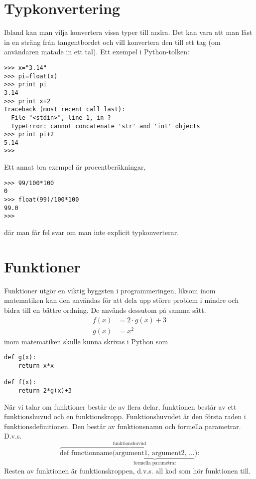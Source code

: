 \section{Typkonvertering}

Ibland kan man vilja konvertera vissa typer till andra. Det kan vara att man
läst in en sträng från tangentbordet och vill konvertera den till ett tag
(om användaren matade in ett tal). Ett exempel i Python-tolken:
\begin{lstlisting}[style=text]
>>> x="3.14"
>>> pi=float(x)
>>> print pi
3.14
>>> print x+2
Traceback (most recent call last):
  File "<stdin>", line 1, in ?
  TypeError: cannot concatenate 'str' and 'int' objects
>>> print pi+2
5.14
>>>
\end{lstlisting}

Ett annat bra exempel är procentberäkningar,
\begin{lstlisting}[style=text]
>>> 99/100*100
0
>>> float(99)/100*100
99.0
>>>
\end{lstlisting}
där man får fel svar om man inte explicit typkonverterar.



\section{Funktioner}

Funktioner utgör en viktig byggsten i programmeringen, liksom inom matematiken
kan den användas för att dela upp större problem i mindre och bidra till en
bättre ordning. De används dessutom på samma sätt.
\begin{align}
	\nonumber
	f(x) &= 2 \cdot g(x) + 3 \\
	\nonumber
	g(x) &= x^2
\end{align}
inom matematiken skulle kunna skrivas i Python som
\begin{lstlisting}
def g(x):
    return x*x

def f(x):
    return 2*g(x)+3
\end{lstlisting}

När vi talar om funktioner består de av flera delar, funktionen består av ett 
funktionshuvud och en funktionskropp. Funktionshuvudet är den första raden i
funktionsdefinitionen. Den består av funktionsnamn och formella parametrar.
D.v.s.
\[
\overbrace{\text{def functionname(}
	\underbrace{\text{argument1, argument2, ...}}_{\text{formella
		parametrar}}\text{):}}^{\text{funktionshuvud}}
\]
Resten av funktionen är funktionskroppen, d.v.s. all kod som hör funktionen
till.



